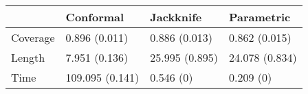 \begin{tabular}{|l|l|l|l|}
\hline
& Conformal & Jackknife & Parametric \\
\hline
Coverage & 0.896 (0.011) & 0.886 (0.013) & 0.862 (0.015) \\
\hline
Length & 7.951 (0.136) & 25.995 (0.895) & 24.078 (0.834) \\
\hline
Time & 109.095 (0.141) & 0.546 (0) & 0.209 (0) \\
\hline
\end{tabular}
